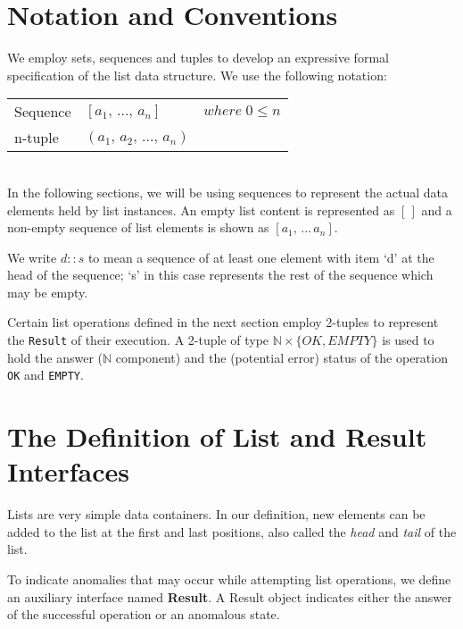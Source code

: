 \documentclass[10pt]{article}
\begin{document}
\section{Notation and Conventions}
We employ sets, sequences and tuples to develop an expressive formal specification of the list data structure. We use the following notation:\vspace*{6pt}\\
\noindent\hspace*{32pt}\begin{tabular}{lll}
  Sequence & $[a_1, \, ..., \, a_n]$ & $where \; 0 \leq n$\vspace*{2pt}\\
  n-tuple & $(a_1, \, a_2, \, ...,\, a_n)$\\
\end{tabular}\vspace*{4pt}\\

In the following sections, we will be using sequences to represent the actual data elements held by list instances. An empty list content is represented as $[\,]$ and a non-empty sequence of list elements is shown as $[a_1, \,...\, a_n].$ 

We write $d::s$ to mean a sequence of at least one element with item `d' at the head of the sequence; `s' in this case represents the rest of the sequence which may be empty. 

 Certain list operations defined in the next section employ 2-tuples to represent the \texttt{Result} of their execution. A 2-tuple of type $\mathbb{N} \times \{OK, EMPTY\}$ is used to hold the answer ($\mathbb{N}$ component) and the (potential error) status of the operation \texttt{OK} and \texttt{EMPTY}. 

\section{The Definition of List and Result Interfaces}
  \noindent Lists are very simple data containers. In our definition, new elements can be added to the list at the first and last positions, also called the \emph{head} and \emph{tail} of the list.

  To indicate anomalies that may occur while attempting list operations, we define an auxiliary interface named \textbf{Result}. A Result object indicates either the answer of the successful operation or an anomalous state.   
  
\end{document}
